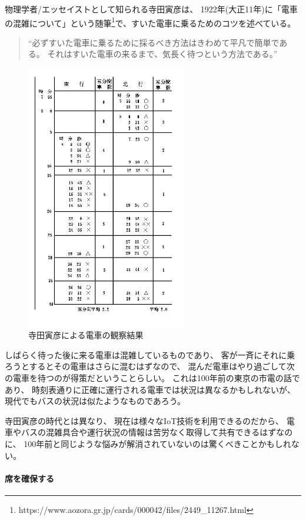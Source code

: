 \documentclass[twocolumn,10pt]{jarticle}
\begin{document}
物理学者/エッセイストとして知られる寺田寅彦は、
1922年(大正11年)に「電車の混雑について」という随筆\footnote{
  \small{\textsf{https://www.aozora.gr.jp{\slash}cards{\slash}000042{\slash}files{\slash}2449\_11267.html}}
}で、すいた電車に乗るためのコツを述べている。

\begin{quotation}
``必ずすいた電車に乗るために採るべき方法はきわめて平凡で簡単である。
  それはすいた電車の来るまで、気長く待つという方法である。''
\end{quotation}

\begin{figure}[htbp]
  \includegraphics[clip,width=7.0cm]{./terada.png}
  \caption{寺田寅彦による電車の観察結果}
\end{figure}

しばらく待った後に来る電車は混雑しているものであり、
客が一斉にそれに乗ろうとするとその電車はさらに混むはずなので、
混んだ電車はやり過ごして次の電車を待つのが得策だということらしい。
これは100年前の東京の市電の話であり、
時刻表通りに正確に運行される電車では状況は異なるかもしれないが、
現代でもバスの状況は似たようなものであろう。

寺田寅彦の時代とは異なり、
現在は様々なIoT技術を利用できるのだから、
電車やバスの混雑具合や運行状況の情報は苦労なく取得して共有できるはずなのに、
100年前と同じような悩みが解消されていないのは驚くべきことかもしれない。

\paragraph{席を確保する}
  
\end{document}
